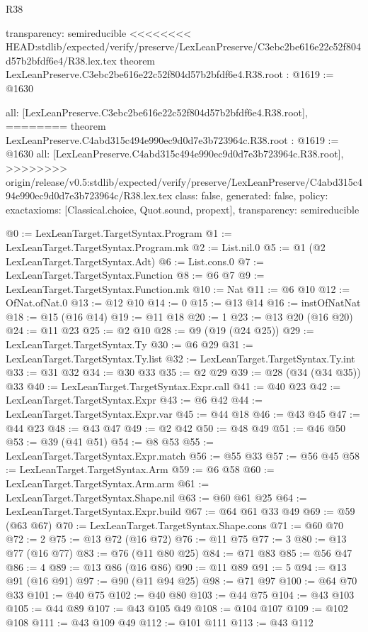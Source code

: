 \begin{lexlean}{R38}
\begin{coremodule}
{{{{{{{{{{{{  transparency: semireducible
}
<<<<<<<< HEAD:stdlib/expected/verify/preserve/LexLeanPreserve/C3ebc2be616e22c52f804d57b2bfdf6e4/R38.lex.tex
theorem LexLeanPreserve.C3ebc2be616e22c52f804d57b2bfdf6e4.R38.root : @1619 := @1630 {
  all: [LexLeanPreserve.C3ebc2be616e22c52f804d57b2bfdf6e4.R38.root],
========
theorem LexLeanPreserve.C4abd315c494e990ec9d0d7e3b723964c.R38.root : @1619 := @1630 {
  all: [LexLeanPreserve.C4abd315c494e990ec9d0d7e3b723964c.R38.root],
>>>>>>>> origin/release/v0.5:stdlib/expected/verify/preserve/LexLeanPreserve/C4abd315c494e990ec9d0d7e3b723964c/R38.lex.tex
  class: false,
  generated: false,
  policy: exact{axioms: [Classical.choice, Quot.sound, propext]},
  transparency: semireducible
}

@0 := LexLeanTarget.TargetSyntax.Program
@1 := LexLeanTarget.TargetSyntax.Program.mk
@2 := List.nil.{0}
@5 := @1 (@2 LexLeanTarget.TargetSyntax.Adt)
@6 := List.cons.{0}
@7 := LexLeanTarget.TargetSyntax.Function
@8 := @6 @7
@9 := LexLeanTarget.TargetSyntax.Function.mk
@10 := Nat
@11 := @6 @10
@12 := OfNat.ofNat.{0}
@13 := @12 @10
@14 := 0
@15 := @13 @14
@16 := instOfNatNat
@18 := @15 (@16 @14)
@19 := @11 @18
@20 := 1
@23 := @13 @20 (@16 @20)
@24 := @11 @23
@25 := @2 @10
@28 := @9 (@19 (@24 @25))
@29 := LexLeanTarget.TargetSyntax.Ty
@30 := @6 @29
@31 := LexLeanTarget.TargetSyntax.Ty.list
@32 := LexLeanTarget.TargetSyntax.Ty.int
@33 := @31 @32
@34 := @30 @33
@35 := @2 @29
@39 := @28 (@34 (@34 @35)) @33
@40 := LexLeanTarget.TargetSyntax.Expr.call
@41 := @40 @23
@42 := LexLeanTarget.TargetSyntax.Expr
@43 := @6 @42
@44 := LexLeanTarget.TargetSyntax.Expr.var
@45 := @44 @18
@46 := @43 @45
@47 := @44 @23
@48 := @43 @47
@49 := @2 @42
@50 := @48 @49
@51 := @46 @50
@53 := @39 (@41 @51)
@54 := @8 @53
@55 := LexLeanTarget.TargetSyntax.Expr.match
@56 := @55 @33
@57 := @56 @45
@58 := LexLeanTarget.TargetSyntax.Arm
@59 := @6 @58
@60 := LexLeanTarget.TargetSyntax.Arm.arm
@61 := LexLeanTarget.TargetSyntax.Shape.nil
@63 := @60 @61 @25
@64 := LexLeanTarget.TargetSyntax.Expr.build
@67 := @64 @61 @33 @49
@69 := @59 (@63 @67)
@70 := LexLeanTarget.TargetSyntax.Shape.cons
@71 := @60 @70
@72 := 2
@75 := @13 @72 (@16 @72)
@76 := @11 @75
@77 := 3
@80 := @13 @77 (@16 @77)
@83 := @76 (@11 @80 @25)
@84 := @71 @83
@85 := @56 @47
@86 := 4
@89 := @13 @86 (@16 @86)
@90 := @11 @89
@91 := 5
@94 := @13 @91 (@16 @91)
@97 := @90 (@11 @94 @25)
@98 := @71 @97
@100 := @64 @70 @33
@101 := @40 @75
@102 := @40 @80
@103 := @44 @75
@104 := @43 @103
@105 := @44 @89
@107 := @43 @105 @49
@108 := @104 @107
@109 := @102 @108
@111 := @43 @109 @49
@112 := @101 @111
@113 := @43 @112
}}}}}}}}}}}}
\end{coremodule}
\end{lexlean}
